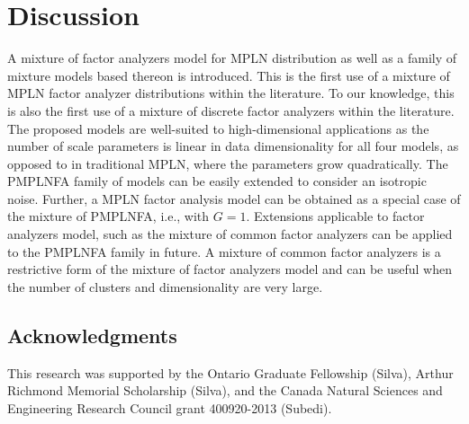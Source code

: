 \documentclass[12pt]{article}
\begin{document}
\section{Discussion}\label{sec:discussion}
A mixture of factor analyzers model for MPLN distribution as well as a family of mixture models based thereon is introduced. This is the first use of a mixture of MPLN factor analyzer distributions within the literature. To our knowledge, this is also the first use of a mixture of discrete factor analyzers within the literature. The proposed models are well-suited to high-dimensional applications as the number of scale parameters is linear in data dimensionality for all four models, as opposed to in traditional MPLN, where the parameters grow quadratically. The PMPLNFA family of models can be easily extended to consider an isotropic noise. Further, a MPLN factor analysis model can be obtained as a special case of the mixture of PMPLNFA, i.e., with $G = 1$. Extensions applicable to factor analyzers model, such as the mixture of common factor analyzers \citep{Baek2010} can be applied to the PMPLNFA family in future. A mixture of common factor analyzers is a restrictive form of the mixture of factor analyzers model and can be useful when the number of clusters and dimensionality are very large. 

\subsection*{Acknowledgments}
{\small This research was supported by the Ontario Graduate Fellowship (Silva), Arthur Richmond Memorial Scholarship (Silva), and the Canada Natural Sciences and Engineering Research Council grant 400920-2013 (Subedi).}

%
%
\end{document}
